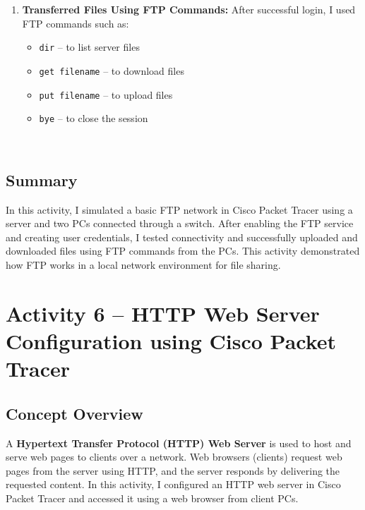 \documentclass[11pt,a4paper]{article}
\let\oldincludegraphics\includegraphics
\renewcommand{\includegraphics}[2][]{%
  \begin{center}
    \oldincludegraphics[#1]{#2}
  \end{center}
}
\begin{document}
\begin{enumerate}

\item \textbf{Transferred Files Using FTP Commands:} After successful login, I used FTP commands such as:
\begin{itemize}
  \item \texttt{dir} – to list server files
  \item \texttt{get filename} – to download files
  \item \texttt{put filename} – to upload files
  \item \texttt{bye} – to close the session
\end{itemize}

 \\[1em]

\end{enumerate}

\subsection{Summary}

In this activity, I simulated a basic FTP network in Cisco Packet Tracer using a server and two PCs connected through a switch. After enabling the FTP service and creating user credentials, I tested connectivity and successfully uploaded and downloaded files using FTP commands from the PCs. This activity demonstrated how FTP works in a local network environment for file sharing.

\section{Activity 6 – HTTP Web Server Configuration using Cisco Packet Tracer}

\subsection{Concept Overview}
A \textbf{Hypertext Transfer Protocol (HTTP) Web Server} is used to host and serve web pages to clients over a network. Web browsers (clients) request web pages from the server using HTTP, and the server responds by delivering the requested content. In this activity, I configured an HTTP web server in Cisco Packet Tracer and accessed it using a web browser from client PCs.
\end{document}
